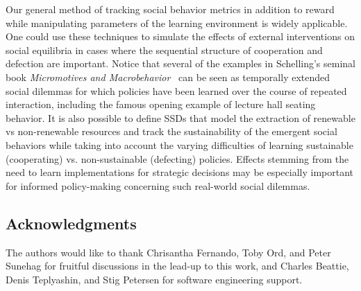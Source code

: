 \documentclass{aamas2017}
\begin{document}
Our general method of tracking social behavior metrics in addition to reward while manipulating parameters of the learning environment is widely applicable. One could use these techniques to simulate the effects of external interventions on social equilibria in cases where the sequential structure of cooperation and defection are important. Notice that several of the examples in Schelling's seminal book \emph{Micromotives and Macrobehavior}~\cite{schelling1978micromotives} can be seen as temporally extended social dilemmas for which policies have been learned over the course of repeated interaction, including the famous opening example of lecture hall seating behavior. It is also possible to define SSDs that model the extraction of renewable vs  non-renewable resources and track the sustainability of the emergent social behaviors while taking into account the varying difficulties of learning sustainable (cooperating) vs. non-sustainable (defecting) policies. Effects stemming from the need to learn implementations for strategic decisions may be especially important for informed policy-making concerning such real-world social dilemmas. 


\subsection*{Acknowledgments}
The authors would like to thank Chrisantha Fernando, Toby Ord, and Peter Sunehag for fruitful discussions in the lead-up to this work, and Charles Beattie, Denis Teplyashin, and Stig Petersen for software engineering support.


\end{document}
